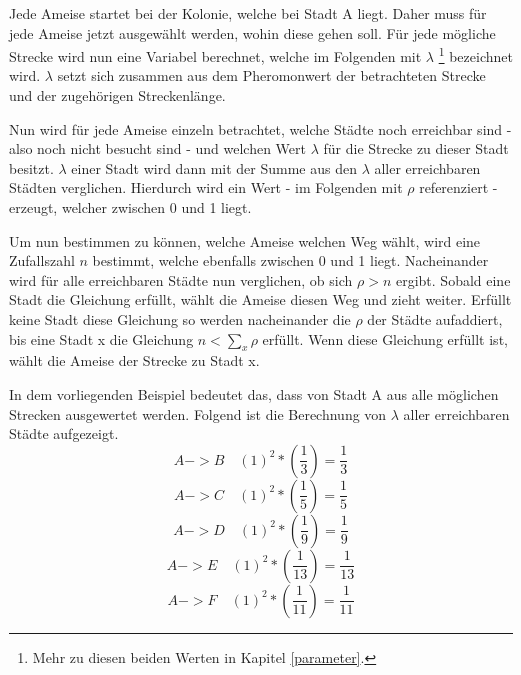 	Jede Ameise startet bei der Kolonie, welche bei Stadt A liegt. Daher muss für jede Ameise jetzt ausgewählt werden, wohin diese gehen soll. Für jede mögliche Strecke wird nun eine Variabel berechnet, welche im Folgenden mit $\lambda$ \footnote{Mehr zu diesen beiden Werten in Kapitel \ref{parameter}.} bezeichnet wird. $\lambda$ setzt sich zusammen aus dem Pheromonwert der betrachteten Strecke und der zugehörigen Streckenlänge.

	Nun wird für jede Ameise einzeln betrachtet, welche Städte noch erreichbar sind - also noch nicht besucht sind - und welchen Wert $\lambda$ für die Strecke zu dieser Stadt besitzt. $\lambda$ einer Stadt wird dann mit der Summe aus den $\lambda$ aller erreichbaren Städten verglichen. Hierdurch wird ein Wert - im Folgenden mit $\rho$ referenziert - erzeugt, welcher zwischen 0 und 1 liegt. 
	
	Um nun bestimmen zu können, welche Ameise welchen Weg wählt, wird eine Zufallszahl $n$ bestimmt, welche ebenfalls zwischen 0 und 1 liegt. Nacheinander wird für alle erreichbaren Städte nun verglichen, ob sich $\rho>n$ ergibt. Sobald eine Stadt die Gleichung erfüllt, wählt die Ameise diesen Weg und zieht weiter. Erfüllt keine Stadt diese Gleichung so werden nacheinander die $\rho$ der Städte aufaddiert, bis eine Stadt x die Gleichung $n < \sum_x^{} \rho$ erfüllt. Wenn diese Gleichung erfüllt ist, wählt die Ameise der Strecke zu Stadt x.
	
	In dem vorliegenden Beispiel bedeutet das, dass von Stadt A aus alle möglichen Strecken ausgewertet werden. Folgend ist die Berechnung von $\lambda$ aller erreichbaren Städte aufgezeigt.
	\begin{equation}
		A -> B \quad (1)^2 * (\frac{1}{3}) = \frac{1}{3}
	\end{equation}
	\begin{equation}
		A -> C \quad (1)^2 * (\frac{1}{5}) = \frac{1}{5}
	\end{equation}
	\begin{equation}
		A -> D \quad (1)^2 * (\frac{1}{9}) = \frac{1}{9}
	\end{equation}
	\begin{equation}
		A -> E \quad (1)^2 * (\frac{1}{13}) = \frac{1}{13}
	\end{equation}
	\begin{equation}
		A -> F \quad (1)^2 * (\frac{1}{11}) = \frac{1}{11}
	\end{equation}
	
